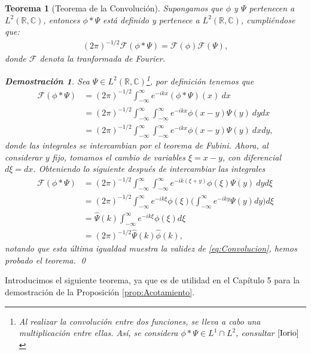 \documentclass[12pt]{article}
\newtheorem{teo}{Teorema}[section]
\theoremstyle{definition}
\newtheorem*{demo}{Demostración}
\newcommand*{\field}[1]{\mathbb{#1}}
\begin{document}
\begin{teo}[Teorema de la Convolución]
    Supongamos que $\phi$ y $\Psi$ pertenecen a $ L^2(\field{R},\field{C})$, entonces $\phi * \Psi$ está definido y pertenece a $L^2(\field{R},\field{C})$, cumpliéndose que:
    \begin{align}
        (2\pi)^{-1/2}\mathcal{F}(\phi * \Psi) = \mathcal{F}(\phi)\mathcal{F}(\Psi),
        \label{eq:Convolucion}
    \end{align}
    donde $\mathcal{F}$ denota la tranformada de Fourier.
    \begin{demo}
    Sea $\Psi \in L^2(\field{R},\field{C})$\footnote{Al realizar la convolución entre dos funciones, se lleva a cabo una multiplicación entre ellas. Así, se considera $\phi*\Psi\in L^1\cap L^2$, consultar $\cite{Iorio}$}, por definición tenemos que
        \begin{align*}
            \mathcal{F}(\phi*\Psi) & = (2\pi)^{-1/2}\int_{-\infty}^{\infty}e^{-ikx}(\phi*\Psi)(x)\:dx
            \\
            & = (2\pi)^{-1/2}\int_{-\infty}^{\infty}\int_{-\infty}^{\infty}e^{-ikx}\phi(x-y)\Psi(y)\:dydx
            \\
            & = 
            (2\pi)^{-1/2}\int_{-\infty}^{\infty}\int_{-\infty}^{\infty}e^{-ikx}\phi(x-y)\Psi(y)\:dxdy,
        \end{align*}
donde las integrales se intercambian por el teorema de Fubini. Ahora, al considerar $y$ fijo, tomamos el cambio de variables $\xi = x - y$, con diferencial $d\xi = dx$. Obteniendo lo siguiente después de intercambiar las integrales
\begin{align*}  \mathcal{F}(\phi*\Psi)
         & =(2\pi)^{-1/2}\int_{-\infty}^{\infty}\int_{-\infty}^{\infty}e^{-ik(\xi + y)}\phi(\xi)\Psi(y)\:dyd\xi
        \\
        & =
        (2\pi)^{-1/2}\int_{-\infty}^{\infty}e^{-ik\xi}\phi(\xi)\bigg(\int_{-\infty}^{\infty}e^{-iky}\Psi(y)dy\bigg)d\xi
        \\
        & =
        \hat{\Psi}(k)\int_{-\infty}^{\infty}e^{-ik\xi}\phi(\xi)d\xi 
        \\
        & =
        (2\pi)^{-1/2}\hat{\Psi}(k)\hat{\phi}(k),
\end{align*}
        notando que esta última igualdad muestra la validez de \eqref{eq:Convolucion}, hemos probado el teorema.
        \qed
    \end{demo}
\end{teo}
\noindent
Introducimos el siguiente teorema, ya que es de utilidad en el Capítulo 5 para la demostración de la Proposición \ref{prop:Acotamiento}.
\end{document}
